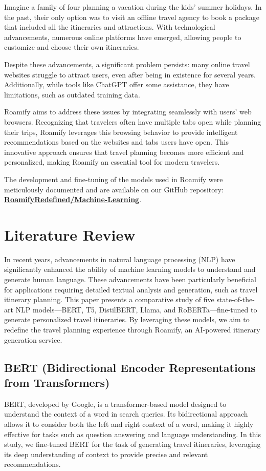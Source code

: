 \documentclass[conference]{IEEEtran}
\begin{document}
Imagine a family of four planning a vacation during the kids' summer holidays. In the past, their only option was to visit an offline travel agency to book a package that included all the itineraries and attractions. With technological advancements, numerous online platforms have emerged, allowing people to customize and choose their own itineraries.

Despite these advancements, a significant problem persists: many online travel websites struggle to attract users, even after being in existence for several years. Additionally, while tools like ChatGPT offer some assistance, they have limitations, such as outdated training data.

Roamify aims to address these issues by integrating seamlessly with users' web browsers. Recognizing that travelers often have multiple tabs open while planning their trips, Roamify leverages this browsing behavior to provide intelligent recommendations based on the websites and tabs users have open. This innovative approach ensures that travel planning becomes more efficient and personalized, making Roamify an essential tool for modern travelers.

The development and fine-tuning of the models used in Roamify were meticulously documented and are available on our GitHub repository: \href{https://github.com/RoamifyRedefined/Machine-Learning}{\textbf{RoamifyRedefined/Machine-Learning}}.

\section{Literature Review}

In recent years, advancements in natural language processing (NLP) have significantly enhanced the ability of machine learning models to understand and generate human language. These advancements have been particularly beneficial for applications requiring detailed textual analysis and generation, such as travel itinerary planning. This paper presents a comparative study of five state-of-the-art NLP models—BERT, T5, DistilBERT, Llama, and RoBERTa—fine-tuned to generate personalized travel itineraries. By leveraging these models, we aim to redefine the travel planning experience through Roamify, an AI-powered itinerary generation service.

\subsection{BERT (Bidirectional Encoder Representations from Transformers)}
BERT, developed by Google, is a transformer-based model designed to understand the context of a word in search queries. Its bidirectional approach allows it to consider both the left and right context of a word, making it highly effective for tasks such as question answering and language understanding. In this study, we fine-tuned BERT for the task of generating travel itineraries, leveraging its deep understanding of context to provide precise and relevant recommendations.
\end{document}
